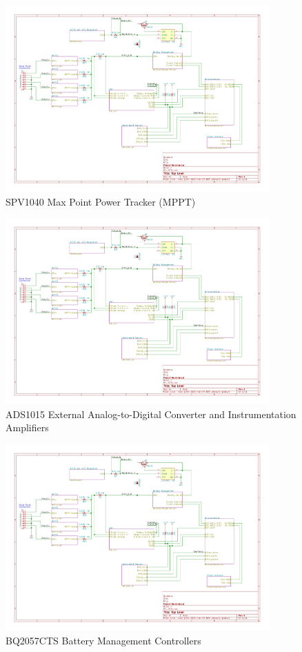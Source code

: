 \documentclass{article}
\numberwithin{figure}{section}
\numberwithin{equation}{section}
\begin{document}
{\begin{figure}[H]
	\centering
	\includegraphics[page=3,width=0.9\textwidth]{RFCxSchematics.pdf}
	\caption{SPV1040 Max Point Power Tracker (MPPT)}
	\label{fig:schemp3}
\end{figure}

\begin{figure}[H]
	\centering
	\includegraphics[page=4,width=0.9\textwidth]{RFCxSchematics.pdf}
	\caption{ADS1015 External Analog-to-Digital Converter and Instrumentation Amplifiers}
	\label{fig:schemp4}
\end{figure}

\begin{figure}[H]
	\centering
	\includegraphics[page=5,width=0.9\textwidth]{RFCxSchematics.pdf}
	\caption{BQ2057CTS Battery Management Controllers}
	\label{fig:schemp5}
\end{figure}

}
\end{document}
